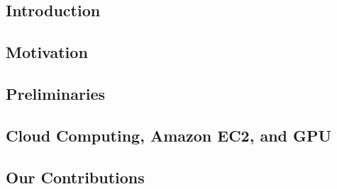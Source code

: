 %
%

\begin{CJK}{Bg5}{bsmi}
\chapter{Introduction}
\label{sec:intro}

\section{Motivation}

\section{Preliminaries}

\section{Cloud Computing, Amazon EC2, and GPU}

\section{Our Contributions}

\end{CJK}
